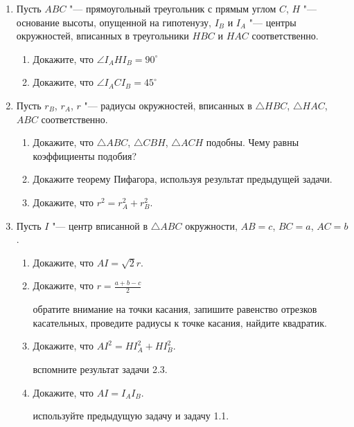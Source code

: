\documentclass[12pt]{article}
\begin{document}
\begin{enumerate}[\bf 1.]
    
\item
Пусть $ABC$ "--- прямоугольный треугольник с прямым углом $C$, $H$ "--- основание высоты, опущенной на гипотенузу, $I_B$ и $I_A$ "--- центры окружностей, вписанных в треугольники $HBC$ и $HAC$ соответственно.

\begin{enumerate}[1.]
    \item Докажите, что $\angle I_A H I_B = 90^\circ$
    \item Докажите, что $\angle I_A C I_B = 45^\circ$
\end{enumerate}

\item
Пусть $r_B$, $r_A$, $r$ "--- радиусы окружностей, вписанных в $\triangle HBC$, $\triangle HAC$, $ABC$ соответственно. 
\begin{enumerate}[1.]
    \item Докажите, что $\triangle ABC$, $ \triangle CBH$,  $\triangle ACH$ подобны. Чему равны коэффициенты подобия?
    \item Докажите теорему Пифагора, используя результат предыдущей задачи.
    \item Докажите, что $r^2 = r_A^2 + r_B^2$.
\end{enumerate}

\item
Пусть $I$ "--- центр вписанной в $\triangle ABC$ окружности, $AB = c$, $BC = a$, $AC = b$.
\begin{enumerate}[1.]
    \item Докажите, что $AI = \sqrt{2} r$.
    \item Докажите, что $r = \frac{a+b-c}{2}$
    \begin{leftbar}
    обратите внимание на точки касания, запишите равенство отрезков касательных, проведите радиусы к точке касания, найдите квадратик.
    \end{leftbar}
    
    \item
    Докажите, что $AI^2 = HI_A^2 + HI_B^2$.
    \begin{leftbar}
    вспомните результат задачи 2.3.
    \end{leftbar}
    
    \item
    Докажите, что $AI = I_AI_B$.
    \begin{leftbar}
    используйте предыдущую задачу и задачу 1.1.
    \end{leftbar}


\end{enumerate}
\end{enumerate}
\end{document}
